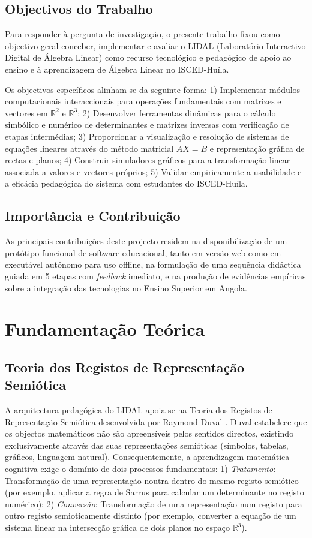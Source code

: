 \documentclass[conference]{IEEEtran}
\begin{document}
\subsection{Objectivos do Trabalho}

Para responder à pergunta de investigação, o presente trabalho fixou como objectivo geral conceber, implementar e avaliar o LIDAL (Laboratório Interactivo Digital de Álgebra Linear) como recurso tecnológico e pedagógico de apoio ao ensino e à aprendizagem de Álgebra Linear no ISCED-Huíla.

Os objectivos específicos alinham-se da seguinte forma: 1) Implementar módulos computacionais interaccionais para operações fundamentais com matrizes e vectores em $\mathbb{R}^2$ e $\mathbb{R}^3$; 2) Desenvolver ferramentas dinâmicas para o cálculo simbólico e numérico de determinantes e matrizes inversas com verificação de etapas intermédias; 3) Proporcionar a visualização e resolução de sistemas de equações lineares através do método matricial $AX = B$ e representação gráfica de rectas e planos; 4) Construir simuladores gráficos para a transformação linear associada a valores e vectores próprios; 5) Validar empiricamente a usabilidade e a eficácia pedagógica do sistema com estudantes do ISCED-Huíla.

\subsection{Importância e Contribuição}

As principais contribuições deste projecto residem na disponibilização de um protótipo funcional de software educacional, tanto em versão web como em executável autónomo para uso offline, na formulação de uma sequência didáctica guiada em 5 etapas com \textit{feedback} imediato, e na produção de evidências empíricas sobre a integração das tecnologias no Ensino Superior em Angola.

\section{Fundamentação Teórica}

\subsection{Teoria dos Registos de Representação Semiótica}

A arquitectura pedagógica do LIDAL apoia-se na Teoria dos Registos de Representação Semiótica desenvolvida por Raymond Duval \cite{duval1995}. Duval estabelece que os objectos matemáticos não são apreensíveis pelos sentidos directos, existindo exclusivamente através das suas representações semióticas (símbolos, tabelas, gráficos, linguagem natural). Consequentemente, a aprendizagem matemática cognitiva exige o domínio de dois processos fundamentais: 1) \textit{Tratamento}: Transformação de uma representação noutra dentro do mesmo registo semiótico (por exemplo, aplicar a regra de Sarrus para calcular um determinante no registo numérico); 2) \textit{Conversão}: Transformação de uma representação num registo para outro registo semioticamente distinto (por exemplo, converter a equação de um sistema linear na intersecção gráfica de dois planos no espaço $\mathbb{R}^3$).
\end{document}
